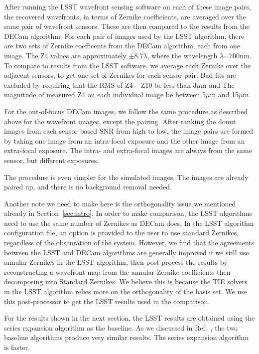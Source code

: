 \documentclass[]{spie}  %
\begin{document}
After running the LSST wavefront sensing software on each of these image pairs, the recovered wavefronts, in terms of Zernike coefficients, are averaged over the same pair of wavefront sensors.
These are then compared to the results from the DECam algorithm.
For each pair of images used by the LSST algorithm, there are two sets of Zernike coefficents from the DECam algorithm, each from one image.
The Z4 values are approximately $\pm$8.7$\lambda$, where the wavelength $\lambda$=700nm.
To compare to results from the LSST software, we average each Zernike over the adjacent sensors, to get one set of Zernikes for each sensor pair.
Bad fits are excluded by requiring that the RMS of Z4 -- Z10 be less than 3$\mu$m and The magnitude of measured Z4 on each individual image be between 5$\mu$m and 15$\mu$m.

For the out-of-focus DECam images, we follow the same procedure as described above for the wavefront images, except the pairing.
After ranking the donut images from each sensor based SNR from high to low, the image pairs are formed by taking one image from an intra-focal exposure and the other image from an extra-focal exposure.
The intra- and extra-focal images are always from the same sensor, but different exposures.

The procedure is even simpler for the simulated images. The images are already paired up, and there is no background removal needed.

Another note we need to make here is the orthogonality issue we mentioned already in Section~\ref{sec:intro}.
In order to make comparison, the LSST algorithms need to use the same number of Zernikes as DECam does.
In the LSST algorithm configuration file, an option is provided to the user to use standard Zernikes, regardless of the obscuration of the system. However, we find that the agreements between the LSST and DECam algorithms are generally improved if we still use annular Zernikes in the LSST algorithm, then post-process the results by reconstructing a wavefront map from the annular Zernike coefficients then decomposing into Standard Zernikes. We believe this is because the TIE solvers in the LSST algorithm relies more on the orthogonality of the basis set.
We use this post-processor to get the LSST results used in the comparison.

For the results shown in the next section, the LSST results are obtained using the series expansion algorithm as the baseline. As we discussed in Ref.~, the two baseline algorithms produce very similar results. The series expansion algorithm is faster.
\end{document}

